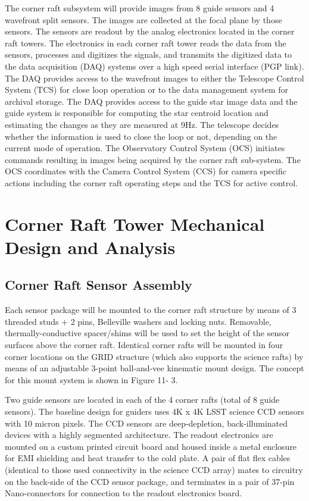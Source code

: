 The corner raft subsystem will provide images from 8 guide sensors and 4 wavefront split sensors. The
images are collected at the focal plane by those sensors. The sensors are readout by the analog
electronics located in the corner raft towers. The electronics in each corner raft tower reads the data
from the sensors, processes and digitizes the signals, and transmits the digitized data to the data
acquisition (DAQ) systems over a high speed serial interface (PGP link). The DAQ provides access to the
wavefront images to either the Telescope Control System (TCS) for close loop operation or to the data
management system for archival storage. The DAQ provides access to the guide star image data and the
guide system is responsible for computing the star centroid location and estimating the changes as they
are measured at 9Hz. The telescope decides whether the information is used to close the loop or not,
depending on the current mode of operation. The Observatory Control System (OCS) initiates
commands resulting in images being acquired by the corner raft sub-system. The OCS coordinates with
the Camera Control System (CCS) for camera specific actions including the corner raft operating steps
and the TCS for active control.

\section{Corner Raft Tower Mechanical Design and Analysis}

\subsection{Corner Raft Sensor Assembly}
Each sensor package will be mounted to the corner raft structure by means of 3 threaded studs + 2 pins,
Belleville washers and locking nuts. Removable, thermally-conductive spacer/shims will be used to set
the height of the sensor surfaces above the corner raft. Identical corner rafts will be mounted in four
corner locations on the GRID structure (which also supports the science rafts) by means of an adjustable
3-point ball-and-vee kinematic mount design. The concept for this mount system is shown in Figure 11-
3.

Two guide sensors are located in each of the 4 corner rafts (total of 8 guide sensors). The baseline
design for guiders uses 4K x 4K LSST science CCD sensors with 10 micron pixels. The CCD sensors are
deep-depletion, back-illuminated devices with a highly segmented architecture. The readout electronics
are mounted on a custom printed circuit board and housed inside a metal enclosure for EMI shielding
and heat transfer to the cold plate. A pair of flat flex cables (identical to those used connectivity in the
science CCD array) mates to circuitry on the back-side of the CCD sensor package, and terminates in a
pair of 37-pin Nano-connectors for connection to the readout electronics board.

